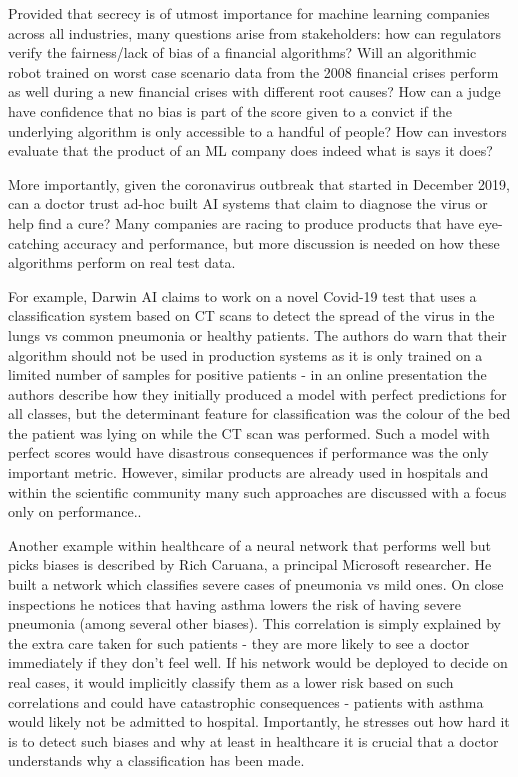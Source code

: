 \documentclass[proposal]{softeng}
\begin{document}
Provided that secrecy is of utmost importance for machine learning companies across all industries, many questions arise from stakeholders: how can regulators verify the fairness/lack of bias of a financial algorithms? Will an algorithmic robot trained on worst case scenario data from the 2008 financial crises perform as well during a new financial crises with different root causes? How can a judge have confidence that no bias is part of the score given to a convict if the underlying algorithm is only accessible to a handful of people? How can investors evaluate that the product of an ML company does indeed what is says it does? 

More importantly, given the coronavirus outbreak that started in December 2019, can a doctor trust ad-hoc built AI systems that claim to diagnose the virus or help find a cure? Many companies are racing to produce products that have eye-catching accuracy and performance, but more discussion is needed on how these algorithms perform on real test data. 

For example, Darwin AI \cite{DarwinAI} claims to work on a novel Covid-19 test that uses a classification system based on CT scans to detect the spread of the virus in the lungs vs common pneumonia or healthy patients\cite{covid-net}. The authors do warn that their algorithm should not be used in production systems as it is only trained on a limited number of samples for positive patients - in an online presentation the authors describe how they initially produced a model with perfect predictions for all classes, but the determinant feature for classification was the colour of the bed the patient was lying on while the CT scan was performed. Such a model with perfect scores would have disastrous consequences if performance was the only important metric. However, similar products are already used in hospitals\cite{aids-doctors} and within the scientific community many such approaches are discussed with a focus only on performance.\cite{ai-covid-19}.

Another example within healthcare of a neural network that performs well but picks biases is described by Rich Caruana, a principal Microsoft researcher. He built a network which classifies severe cases of pneumonia vs mild ones\cite{rich-caruana}. On close inspections he notices that having asthma lowers the risk of having severe pneumonia (among several other biases). This correlation is simply explained by the extra care taken for such patients - they are more likely to see a doctor immediately if they don't feel well. If his network would be deployed to decide on real cases, it would implicitly classify them as a lower risk based on such correlations and could have catastrophic consequences - patients with asthma would likely not be admitted to hospital. Importantly, he stresses out how hard it is to detect such biases and why at least in healthcare it is crucial that a doctor understands why a classification has been made. 
\end{document}

